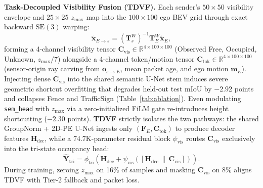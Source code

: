 \documentclass[journal]{IEEEtran}
\begin{document}
\textbf{Task-Decoupled Visibility Fusion (TDVF).} Each sender's $50\times 50$ visibility envelope and $25\times 25$ $z_{\max}$ map into the $100\times 100$ ego BEV grid through exact backward $\mathrm{SE}(3)$ warping:
\begin{equation}
\tilde{\mathbf{x}}_{E \to s} = \left(\mathbf{T}_s^W\right)^{-1} \mathbf{T}_E^W \tilde{\mathbf{x}}_E,
\label{eq:env_warp}
\end{equation}
forming a 4-channel visibility tensor $\mathbf{C}_{\mathrm{vis}} \in \mathbb{R}^{4\times 100\times 100}$ (Observed Free, Occupied, Unknown, $z_{\max}/7$) alongside a 4-channel token/motion tensor $\mathbf{C}_{\mathrm{tok}} \in \mathbb{R}^{4\times 100\times 100}$ (sensor-origin ray carving from $\mathbf{o}_{s\to E}$, mean packet age, and ego motion $\mathbf{m}_E$). Injecting dense $\mathbf{C}_{\mathrm{vis}}$ into the shared semantic U-Net stem induces severe geometric shortcut overfitting that degrades held-out test mIoU by $-2.92$ points and collapses Fence and TrafficSign (Table~\ref{tab:ablation}). Even modulating \texttt{sem\_head} with $z_{\max}$ via a zero-initialized FiLM gate re-introduces height shortcutting ($-2.30$ points). \textbf{TDVF} strictly isolates the two pathways: the shared GroupNorm + 2D-PE U-Net ingests only $(\mathbf{F}_E, \mathbf{C}_{\mathrm{tok}})$ to produce decoder features $\mathbf{H}_{\mathrm{dec}}$, while a 74.7K-parameter residual block $\psi_{\mathrm{vis}}$ routes $\mathbf{C}_{\mathrm{vis}}$ exclusively into the tri-state occupancy head:
\begin{equation}
\hat{\mathbf{Y}}_{\mathrm{tri}} = \phi_{\mathrm{tri}}\!\left(\mathbf{H}_{\mathrm{dec}} + \psi_{\mathrm{vis}}\!\left([\mathbf{H}_{\mathrm{dec}} \,\|\, \mathbf{C}_{\mathrm{vis}}]\right)\right).
\label{eq:tdvf}
\end{equation}
During training, zeroing $z_{\max}$ on 16\% of samples and masking $\mathbf{C}_{\mathrm{vis}}$ on 8\% aligns TDVF with Tier-2 fallback and packet loss.
\end{document}
